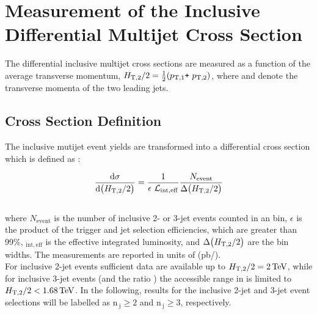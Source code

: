 \chapter{Measurement of the Inclusive Differential Multijet Cross Section}
\label{chap:measurement}
The differential inclusive multijet cross sections are measured as a function of the average transverse momentum, $\httwo = \frac{1}{2}(\ptone \plus \pttwo)$, where \ptone and \pttwo denote the transverse momenta of the two leading jets.

\section{Cross Section Definition}
The inclusive mutijet event yields are transformed into a differential cross section which is defined as :

\begin{equation}
 \label{inclusive_formula}
 {\dd{\sigma}{\big(\httwo\big)}} = \frac{1}{\epsilon~\lumi_{\mathrm{int,eff}}}\frac{N_\mathrm{event}}{\Delta\big(\httwo\big)}
\end{equation}\\
where $N_\mathrm{event}$ is the number of inclusive 2- or 3-jet events counted in an \httwo bin, $\epsilon$ is the product of the trigger 
and jet selection efficiencies, which are greater than 99\%, \lumins$_{\mathrm{int,eff}}$ is the effective integrated luminosity, and $
\Delta\big(H_{\mathrm{T,2}}/2\big)$ are the bin widths. The measurements are reported in units of (pb/\GeV).\\
For inclusive 2-jet events sufficient data are available up to $H_{\mathrm{T,2}}/2 = 2\,\text{Te\hspace{-.08em}V}$, while for inclusive 3-jet events (and the ratio \ratio) 
the accessible range in \httwo is limited to $H_{\mathrm{T,2}}/2 < 1.68\,\text{Te\hspace{-.08em}V}$. In the following, results for the inclusive 2-jet and 3-jet event 
selections will be labelled as $\mathrm {n_{~j}} \geq 2$ and $\mathrm {n_{~j}} \geq 3$, respectively.

